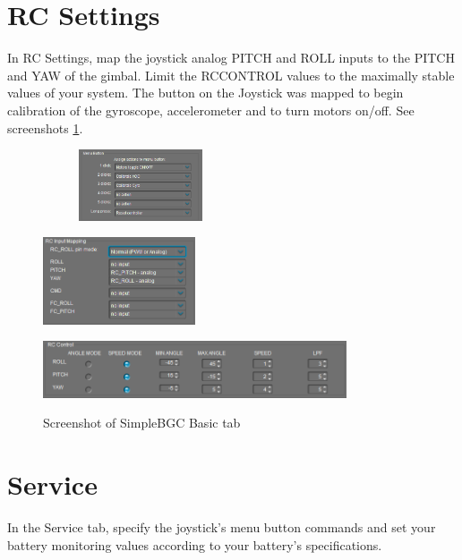 \section{RC Settings}
In RC Settings, map the joystick analog PITCH and ROLL inputs to the PITCH and YAW of the gimbal. Limit the RCCONTROL values to the maximally stable values of your system. The button on the Joystick was mapped to begin calibration of the gyroscope, accelerometer and to turn motors on/off. See screenshots \ref{SRNSHOT:BGCjoystick}.

\begin{figure}[!h]
    \centering
    \begin{subfigure}
        \raggedleft
        \includegraphics[width=0.4\textwidth]{BGCSetup/SimpleBGCMenu.PNG}
    \end{subfigure}%
    \begin{subfigure}
        \raggedright
        \includegraphics[width=0.4\textwidth]{BGCSetup/SimpleBGCRCInput.PNG}
    \end{subfigure}
\end{figure}
\vspace{-0.5cm}
\begin{figure}[!h]
    \centering
    \includegraphics[width=0.8\textwidth]{BGCSetup/SimpleBGCRCControl.PNG}
    \label{SRNSHOT:BGCjoystick}
    \caption{Screenshot of SimpleBGC Basic tab}
\end{figure}

\section{Service}
In the Service tab, specify the joystick’s menu button commands and set your battery monitoring values according to your battery’s specifications.

